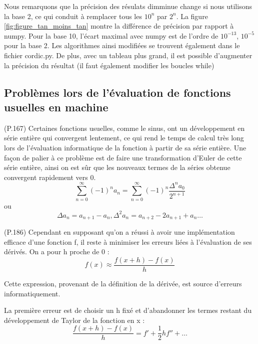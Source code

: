 \documentclass{article}
\def\cordicPythonFile{cordic.py}
\begin{document}
Nous remarquons que la précision des résulats dimminue change si nous utilisons la base 2, ce qui conduit à remplacer tous les $10^n$ par $2^n$. La figure \ref{fig:figure_tan_moins_tan} montre la différence de précision par rapport à numpy. Pour la base 10, l'écart maximal avec numpy est de l'ordre de $10^{-13}$, $10^{-5}$ pour la base 2. Les algorithmes ainsi modifiées se trouvent également dans le fichier \cordicPythonFile. De plus, avec un tableau plus grand, il est possible d'augmenter la précision du résultat (il faut également modifier les boucles while)

\subsection*{Problèmes lors de l’évaluation de fonctions usuelles en machine}

(P.167) Certaines fonctions usuelles, comme le sinus, ont un développement en série entière qui convergent lentement, ce qui rend le temps de calcul très long lors de l'évaluation informatique de la fonction à partir de sa série entière. Une façon de palier à ce problème est de faire une transformation d'Euler de cette série entière, ainsi on est sûr que les nouveaux termes de la séries obtenue convergent rapidement vers 0.\\
\begin{equation}
    \sum_{n=0}^\infty (-1)^n a_n = \sum_{n=0}^\infty (-1)^n \frac {\Delta^n a_0} {2^{n+1}}
    \label{eq:Euler_Transfo}
\end{equation}
ou
\begin{equation}
    \Delta a_n=a_{n+1}-a_n,\Delta^2 a_n=a_{n+2}-2a_{n+1}+a_n \dots
    \label{eq:Euler_Transfo_2}
\end{equation}

(P.186) Cependant en supposant  qu'on a réussi à avoir une implémentation efficace d'une fonction f, il reste à minimiser les erreurs liées à l'évaluation de ses dérivés. On a pour h proche de 0 : 
\begin{equation}
    f(x)\approx\frac{f(x+h)-f(x)}{h}
    \label{eq:derivée}
\end{equation}

Cette expression, provenant de la définition de la dérivée, est source d'erreurs informatiquement.

La première erreur est de choisir un h fixé et d’abandonner les termes restant du développement de Taylor de la fonction en x :
\begin{equation}
    \frac{f(x+h)-f(x)}{h}=f'+\frac{1}{2}hf''+ \dots
    \label{eq:developpement_de_Taylor}
\end{equation}
\end{document}
